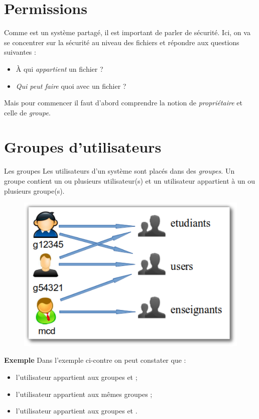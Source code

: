 \documentclass[a4paper,11pt]{style-esi/td}
\begin{document}
\entete
\titre
{}
\lastedit

\bigskip
\tableofcontents
\newpage

\section{Permissions}

	Comme  est un système partagé, il est important de parler de sécurité. 
	Ici, on va se concentrer sur la sécurité au niveau des fichiers 
	et répondre aux questions suivantes :  
	\begin{itemize}
	\item À qui \emph{appartient} un fichier ?
	\item \emph{Qui peut faire} quoi avec un fichier ?
	\end{itemize}

	Mais pour commencer il faut d'abord comprendre 
	la notion de \textit{propriétaire}
	et celle de \textit{groupe}. 

	\section{Groupes d'utilisateurs}

		\begin{theorie}{Les groupes}
			Les utilisateurs d'un système  sont placés 
			dans des \emph{groupes}. 
			Un groupe contient un ou plusieurs utilisateur(s) 
			et un utilisateur appartient à un ou plusieurs groupe(s).
		\end{theorie}

		\begin{figure}
			\vspace{-1em}
			\includegraphics[width=.3\textwidth]{image/groupes.pdf}
			\vspace{-3em}
		\end{figure}
		\textbf{Exemple}
		Dans l'exemple ci-contre on peut constater que :
		\begin{itemize}
		\item 
			l'utilisateur  appartient 
			aux groupes  et  ;
		\item 
			l'utilisateur  appartient aux mêmes groupes ;
		\item 
			l'utilisateur  appartient 
			aux groupes  et .
		\end{itemize}
		
\end{document}
